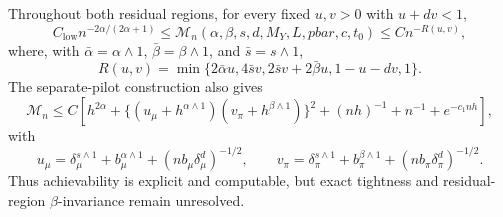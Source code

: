 Throughout both residual regions, for every fixed \(u,v>0\) with \(u+dv<1\),
\[
C_{\mathrm{low}}n^{-2\alpha/(2\alpha+1)}
\le \mathcal M_n(\alpha,\beta,s,d,M_Y,L,pbar,c,t_0)
\le C n^{-R(u,v)},
\]
where, with \(\bar\alpha=\alpha\wedge1\), \(\bar\beta=\beta\wedge1\), and \(\bar s=s\wedge1\),
\[
R(u,v)=\min\{2\bar\alpha u,4\bar s v,2\bar s v+2\bar\beta u,1-u-dv,1\}.
\]
The separate-pilot construction also gives
\[
\mathcal M_n\le C\left[h^{2\alpha}+\{(u_\mu+h^{\alpha\wedge1})(v_\pi+h^{\beta\wedge1})\}^2+(nh)^{-1}+n^{-1}+e^{-c_1nh}\right],
\]
with
\[
u_\mu=\delta_\mu^{s\wedge1}+b_\mu^{\alpha\wedge1}+(nb_\mu\delta_\mu^d)^{-1/2},
\qquad
v_\pi=\delta_\pi^{s\wedge1}+b_\pi^{\beta\wedge1}+(nb_\pi\delta_\pi^d)^{-1/2}.
\]
Thus achievability is explicit and computable, but exact tightness and residual-region \(\beta\)-invariance remain unresolved.